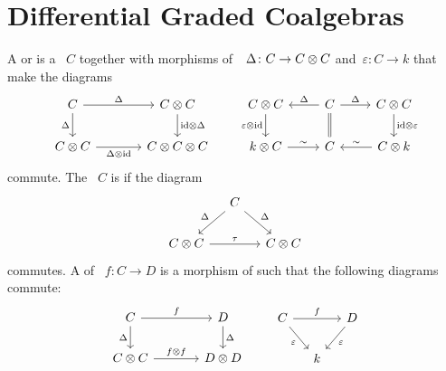 \documentclass[a4paper,10pt,headings=standardclasses]{scrartcl}
\begin{document}
\section{Differential Graded Coalgebras}

\begin{definition}
  A  or  is a {\dgv}~$C$ together with morphisms of~{\dgvs}~$\Delta \colon C \to C \otimes C$ and~$\varepsilon \colon C \to k$ that make the diagrams
  \[
    \begin{tikzcd}[column sep = large]
      C
      \arrow{r}[above]{\Delta}
      \arrow{d}[left]{\Delta}
      &
      C \tensor C
      \arrow{d}[right]{{\id} \tensor \Delta}
      \\
      C \tensor C
      \arrow{r}[below]{\Delta \tensor {\id}}
      &
      C \tensor C \tensor C
    \end{tikzcd}
    \qquad
    \begin{tikzcd}
      C \tensor C
      \arrow{d}[left]{\varepsilon \tensor {\id}}
      &
      C
      \arrow{l}[above]{\Delta}
      \arrow[equal]{d}
      \arrow{r}[above]{\Delta}
      &
      C \tensor C
      \arrow{d}[right]{{\id} \tensor \varepsilon}
      \\
      k \tensor C
      \arrow{r}[above]{\sim}
      &
      C
      &
      C \tensor k
      \arrow{l}[above]{\sim}
    \end{tikzcd}
  \]
  commute.
  The {\dgc}~$C$ is  if the diagram
  \[
    \begin{tikzcd}[column sep = small]
      {}
      &
      C
      \arrow{dl}[above left]{\Delta}
      \arrow{dr}[above right]{\Delta}
      &
      {}
      \\
      C \tensor C
      \arrow{rr}[above]{\tau}
      &
      {}
      &
      C \tensor C
    \end{tikzcd}
  \]
  commutes.
  A  of {\dgc}~$f \colon C \to D$ is a morphism of {\dgvs} such that the following diagrams commute:
  \[
    \begin{tikzcd}[column sep = large]
      C
      \arrow{r}[above]{f}
      \arrow{d}[left]{\Delta}
      &
      D
      \arrow{d}[right]{\Delta}
      \\
      C \tensor C
      \arrow{r}[above]{f \tensor f}
      &
      D \tensor D
    \end{tikzcd}
    \qquad
    \begin{tikzcd}[column sep = small]
      C
      \arrow{rr}[above]{f}
      \arrow{dr}[below left]{\varepsilon}
      &
      {}
      &
      D
      \arrow{dl}[below right]{\varepsilon}
      \\
      {}
      &
      k
      &
      {}
    \end{tikzcd}
  \]
\end{definition}
\end{document}
